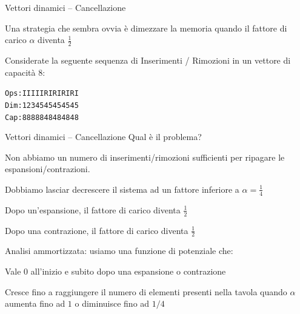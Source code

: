 \begin{frame}[fragile]{Vettori dinamici -- Cancellazione}
	
\begin{myboxtitle}
Una strategia che sembra ovvia è dimezzare la memoria quando il fattore di carico $\alpha$ diventa $\frac{1}{2}$
\end{myboxtitle}


\pause
\bigskip
Considerate la seguente sequenza di \alert{I}nserimenti / \alert{R}imozioni in un vettore di capacità $8$:
\begin{alltt}
Ops: I I I I I R I R I R I R I
Dim: 1 2 3 4 5 4 5 4 5 4 5 4 5
Cap: 8 8 8 8 8 4 8 4 8 4 8 4 8
\end{alltt}

\end{frame}

\begin{frame}{Vettori dinamici -- Cancellazione}
Qual è il problema?
\BI
\item Non abbiamo un numero di inserimenti/rimozioni sufficienti per ripagare le espansioni/contrazioni.
\EI

\bigskip
Dobbiamo lasciar decrescere il sistema ad un fattore inferiore a $\alpha = \frac{1}{4}$
\BI
\item Dopo un'espansione, il fattore di carico diventa $\frac{1}{2}$
\item Dopo una contrazione, il fattore di carico diventa $\frac{1}{2}$
\EI

\bigskip
Analisi ammortizzata: usiamo una funzione di potenziale che:
\BI
\item Vale $0$ all’inizio e subito dopo una espansione o contrazione
\item Cresce fino a raggiungere il numero di elementi presenti nella tavola quando $\alpha$ aumenta fino ad $1$ o diminuisce fino ad $1/4$
\EI
\end{frame}

